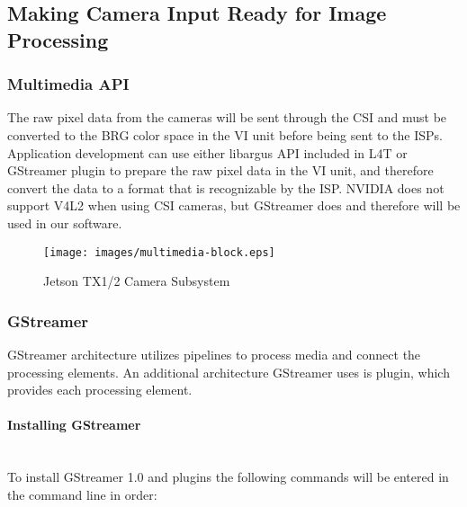 \documentclass[letterpaper,10pt,serif,draftclsnofoot,onecolumn,compsoc,titlepage]{IEEEtran}
\begin{document}
\subsection{Making Camera Input Ready for Image Processing}

\subsubsection{Multimedia API}

The raw pixel data from the cameras will be sent through the CSI and must be converted 
to the BRG color space in the VI unit before being sent to the ISPs. 
Application development can use either libargus API 
included in L4T or GStreamer plugin to prepare the raw pixel data in the VI unit, and 
therefore convert the data to a format that is recognizable by the ISP. NVIDIA does not 
support V4L2 when using CSI cameras, but GStreamer does and therefore will be used in 
our software.  \\

	\begin{figure}[H]
		\centering
		\label{fig:MultimediaBlockDiagram}
		\texttt{[image: images/multimedia-block.eps]}
		\caption{Jetson TX1/2 Camera Subsystem\cite{CSubDia} \label{overflow}}
	\end{figure}

\subsubsection{GStreamer}

GStreamer architecture utilizes pipelines to process media and connect the processing 
elements. An additional architecture GStreamer uses is plugin, which provides each 
processing element. \\

\paragraph{Installing GStreamer}\mbox{} \\ 

To install GStreamer 1.0 and plugins the following commands will be entered in the 
command line in order\cite{GStmUG}: \\
\end{document}
